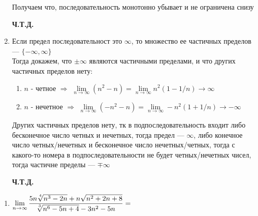 \documentclass{report}
\begin{document}
\begin{enumerate}
\begin{equation*}
		\end{equation*}
		Получаем что, последовательность монотонно убывает и не ограничена снизу
		\begin{center}
			\textbf{Ч.Т.Д.}
		\end{center}
	\item Если предел последовательност это $\infty$, то множество ее частичных пределов --- $\lbrace-\infty, \infty\rbrace$\\
	Тогда докажем, что $\pm \infty$ являются частичными пределами, и что других частичных пределов нету:
	\begin{enumerate}
		\item $n$ - четное $\Rightarrow$
			$\lim\limits_{n\to\infty} (n^2-n)=\lim\limits_{n\to\infty} n^2(1-1/n) \to \infty$

		\item $n$ - нечетное $\Rightarrow$
			$\lim\limits_{n\to\infty} (-n^2-n)=\lim\limits_{n\to\infty} -n^2(1+1/n) \to -\infty$
	\end{enumerate}
	Других частичных пределов нету, тк в подпоследовательность входит либо бесконечное число четных и нечетных, тогда предел --- $\infty$, либо конечное число четных/нечетных и бесконечное число нечетных/четных, тогда с какого-то номера в подпоследовательности не будет четных/нечетных чисел, тогда частичне пределы --- $\mp \infty$
	\begin{center}
		\textbf{Ч.Т.Д.}
	\end{center}
\end{enumerate}
\sol
\begin{enumerate}
	\item $\lim\limits_{n\to\infty} \dfrac{5n\sqrt[\leftroot{0}\uproot{2}4]{n^3-2n}+n\sqrt{n^2+2n+8}}{\sqrt[\leftroot{0}\uproot{2}3]{n^6-5n+4}-3n^2-5n}=$
\end{enumerate}
\end{document}
